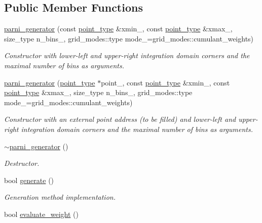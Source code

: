 \subsection*{Public Member Functions}
\begin{DoxyCompactItemize}
\item 
\hyperlink{a00393_a1bed51e5d9a2f72de634a028e870ce20}{parni\+\_\+generator} (const \hyperlink{a00579}{point\+\_\+type} \&xmin\+\_\+, const \hyperlink{a00579}{point\+\_\+type} \&xmax\+\_\+, size\+\_\+type n\+\_\+bins\+\_, grid\+\_\+modes\+::type mode\+\_\+=grid\+\_\+modes\+::cumulant\+\_\+weights)
\begin{DoxyCompactList}\small\item\em Constructor with lower-\/left and upper-\/right integration domain corners and the maximal number of bins as arguments. \end{DoxyCompactList}\item 
\hyperlink{a00393_a51ae638eb78808116671ad4297843183}{parni\+\_\+generator} (\hyperlink{a00579}{point\+\_\+type} $\ast$point\+\_\+, const \hyperlink{a00579}{point\+\_\+type} \&xmin\+\_\+, const \hyperlink{a00579}{point\+\_\+type} \&xmax\+\_\+, size\+\_\+type n\+\_\+bins\+\_, grid\+\_\+modes\+::type mode\+\_\+=grid\+\_\+modes\+::cumulant\+\_\+weights)
\begin{DoxyCompactList}\small\item\em Constructor with an external point address (to be filled) and lower-\/left and upper-\/right integration domain corners and the maximal number of bins as arguments. \end{DoxyCompactList}\item 
\hypertarget{a00393_af5c8fdfaaebc9ff10cbbdb40bb42274d}{}\hyperlink{a00393_af5c8fdfaaebc9ff10cbbdb40bb42274d}{$\sim$parni\+\_\+generator} ()\label{a00393_af5c8fdfaaebc9ff10cbbdb40bb42274d}

\begin{DoxyCompactList}\small\item\em Destructor. \end{DoxyCompactList}\item 
\hypertarget{a00393_a5ecf885625343527c23fafaea48de1d4}{}bool \hyperlink{a00393_a5ecf885625343527c23fafaea48de1d4}{generate} ()\label{a00393_a5ecf885625343527c23fafaea48de1d4}

\begin{DoxyCompactList}\small\item\em Generation method implementation. \end{DoxyCompactList}\item 
\hypertarget{a00393_abec7bb0d7a4d65c60998f00547809cc4}{}bool \hyperlink{a00393_abec7bb0d7a4d65c60998f00547809cc4}{evaluate\+\_\+weight} ()\label{a00393_abec7bb0d7a4d65c60998f00547809cc4}


\end{DoxyCompactItemize}
